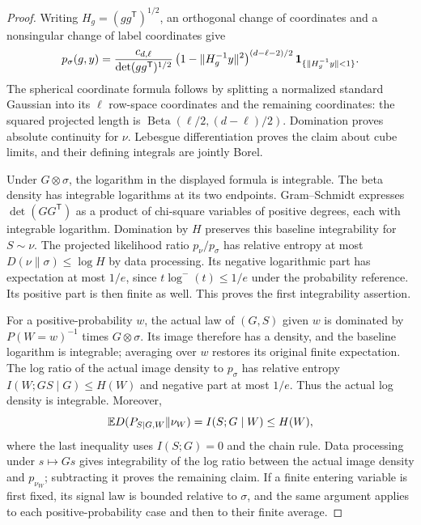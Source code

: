 \begin{proof}
Writing \(H_g=(gg^{\mathsf T})^{1/2}\), an orthogonal change of
coordinates and a nonsingular change of label coordinates give
\[
 p_\sigma(g,y)=
 \frac{c_{d,\ell}}{\det(gg^{\mathsf T})^{1/2}}
 \left(1-\|H_g^{-1}y\|^2\right)^{(d-\ell-2)/2}
 \mathbf 1_{\{\|H_g^{-1}y\|<1\}}.
\]
The spherical coordinate formula follows by splitting a normalized
standard Gaussian into its \(\ell\) row-space coordinates and the
remaining coordinates: the squared projected length is
\(\operatorname{Beta}(\ell/2,(d-\ell)/2)\). Domination proves absolute
continuity for \(\nu\). Lebesgue differentiation proves the claim
about cube limits, and their defining integrals are jointly Borel.

Under \(G\otimes\sigma\), the logarithm in the displayed formula is
integrable. The beta density has integrable logarithms at its two
endpoints. Gram--Schmidt expresses \(\det(GG^{\mathsf T})\) as a
product of chi-square variables of positive degrees, each with
integrable logarithm. Domination by \(H\) preserves this baseline
integrability for \(S\sim\nu\). The projected likelihood ratio
\(p_\nu/p_\sigma\) has relative entropy at most
\(D(\nu\|\sigma)\le\log H\) by data processing. Its negative
logarithmic part has expectation at most \(1/e\), since
\(t\log^-(t)\le1/e\) under the probability reference. Its positive
part is then finite as well. This proves the first integrability
assertion.

For a positive-probability \(w\), the actual law of \((G,S)\) given
\(w\) is dominated by \(P(W=w)^{-1}\) times \(G\otimes\sigma\).
Its image therefore has a density, and the baseline logarithm is
integrable; averaging over \(w\) restores its original finite
expectation. The log ratio of the actual image density to
\(p_\sigma\) has relative entropy \(I(W;GS\mid G)\le H(W)\) and
negative part at most \(1/e\). Thus the actual log density is
integrable. Moreover,
\[
 \mathbb E D(P_{S\mid G,W}\|\nu_W)=I(S;G\mid W)\le H(W),
\]
where the last inequality uses \(I(S;G)=0\) and the chain rule.
Data processing under \(s\mapsto Gs\) gives integrability of the
log ratio between the actual image density and \(p_{\nu_W}\);
subtracting it proves the remaining claim. If a finite entering
variable is first fixed, its signal law is bounded relative to
\(\sigma\), and the same argument applies to each positive-probability
case and then to their finite average.
\end{proof}

